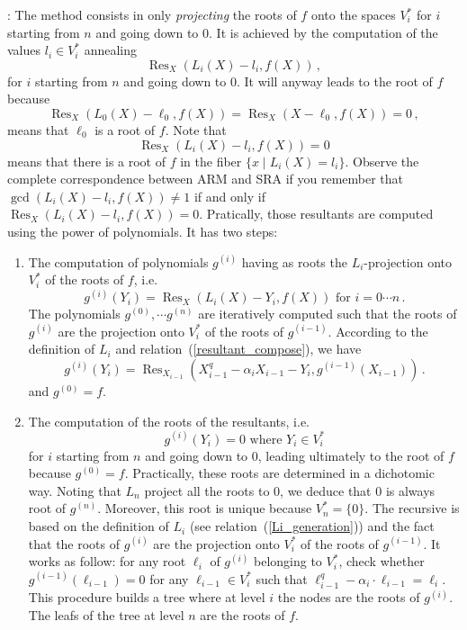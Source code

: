 \documentclass{sig-alternate}
\DeclareMathOperator{\Res}{Res}
\begin{document}
\medskip

: The method consists in only \emph{projecting} the roots of $f$ onto the spaces $V_i^\ast$ for $i$ starting from $n$ and going down to 0.
It is achieved by the computation of the values $l_i \in V_i^\ast$ annealing 
 \begin{equation}
 \label{base_SRA}
\Res_X(L_i(X)-l_i,f(X)) \,,
\end{equation}
for $i$ starting from $n$ and going down to 0. It will anyway leads to the root of $f$ because 
$$\Res_X(L_0(X)-\ell_0,f(X))=\Res_X(X-\ell_0,f(X))=0\,,$$
means that $\ell_0$ is a root of $f$. Note that 
$$\Res_X(L_i(X)-l_i,f(X)) =0$$
means that there is a root of $f$ in the fiber $\{x \mid L_i(X)=l_i \}$.
Observe the complete correspondence between ARM and SRA if you remember that 
$\gcd(L_i(X)-l_i,f(X)) \ne 1$ if and only if $\Res_X(L_i(X)-l_i,f(X)) =0$.
Pratically, those resultants are computed using the power of polynomials. It has two steps:
\begin{enumerate}
\item The computation of polynomials $g^{(i)}$ having as roots the $L_i$-projection onto $V_i^\ast$ of the roots of $f$,  i.e.
  $$g^{(i)}(Y_i)=\Res_{X}(L_i(X)-Y_i,f(X))  \mbox{ for }i=0 \cdots n \,.$$
  The polynomials $g^{(0)}, \cdots g^{(n)}$ are iteratively computed such that the roots of $g^{(i)}$ are the projection onto 
  $V_i^\ast$ of the roots of $g^{(i-1)}$. According to the definition of $L_i$ and relation~(\ref{resultant_compose}), we have
  $$g^{(i)}(Y_i)=\Res_{X_{i-1}}(X^q_{i-1} - \alpha_i X_{i-1} -Y_i,g^{(i-1)}(X_{i-1})) \,.$$
 and $g ^{(0)}=f$.
\item The computation of the roots of the resultants, i.e.
$$g^{(i)}(Y_i)=0  \mbox{ where }  Y_i \in   V_i^\ast$$
for $i$ starting from $n$ and going down to 0, leading ultimately to the root of $f$ because $g^{(0)}=f$. Practically, these roots 
are determined in a dichotomic way. Noting that $L_n$ project all the roots to $0$,
 we deduce that $0$ is always root of $g^{(n)}$. Moreover, this root is unique because $V_n^\ast=\{0\}$.
The recursive is based on the definition of $L_i$ (see relation~(\ref{Li_generation})) and the fact that the roots of $g^{(i)}$ are the projection onto 
  $V_i^\ast$ of the roots of $g^{(i-1)}$. It works as follow: for any root $\ell_i$ of $g^{(i)}$ belonging to $V_i^\ast$, check whether $g^{(i-1)}(\ell_{i-1})=0$
   for any $\ell_{i-1} \in V_i^\ast$ such that $\ell_{i-1}^q-\alpha_i \cdot \ell_{i-1}=\ell_i$. This procedure builds a tree where at level $i$ the nodes are the roots of $g^{(i)}$. 
   The leafs of the tree at level $n$ are the roots of $f$.
\end{enumerate}
\end{document}
